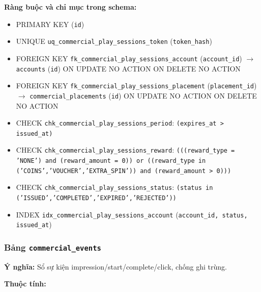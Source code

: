 \textbf{Ràng buộc và chỉ mục trong schema:}

\begin{itemize}

\item PRIMARY KEY (\texttt{id})

\item UNIQUE \texttt{uq\_commercial\_play\_sessions\_token} (\texttt{token\_hash})

\item FOREIGN KEY \texttt{fk\_commercial\_play\_sessions\_account} (\texttt{account\_id}) $\rightarrow$ \texttt{accounts} (\texttt{id}) ON UPDATE NO ACTION ON DELETE NO ACTION

\item FOREIGN KEY \texttt{fk\_commercial\_play\_sessions\_placement} (\texttt{placement\_id}) $\rightarrow$ \texttt{commercial\_placements} (\texttt{id}) ON UPDATE NO ACTION ON DELETE NO ACTION

\item CHECK \texttt{chk\_commercial\_play\_sessions\_period}: \texttt{(expires\_at > issued\_at)}

\item CHECK \texttt{chk\_commercial\_play\_sessions\_reward}: \texttt{(((reward\_type = 'NONE') and (reward\_amount = 0)) or ((reward\_type in ('COINS','VOUCHER','EXTRA\_SPIN')) and (reward\_amount > 0)))}

\item CHECK \texttt{chk\_commercial\_play\_sessions\_status}: \texttt{(status in ('ISSUED','COMPLETED','EXPIRED','REJECTED'))}

\item INDEX \texttt{idx\_commercial\_play\_sessions\_account} (\texttt{account\_id, status, issued\_at})

\end{itemize}

\subsubsection{Bảng \texttt{commercial\_events}}

\textbf{Ý nghĩa:} Sổ sự kiện impression/start/complete/click, chống ghi trùng.\par

\textbf{Thuộc tính:}

